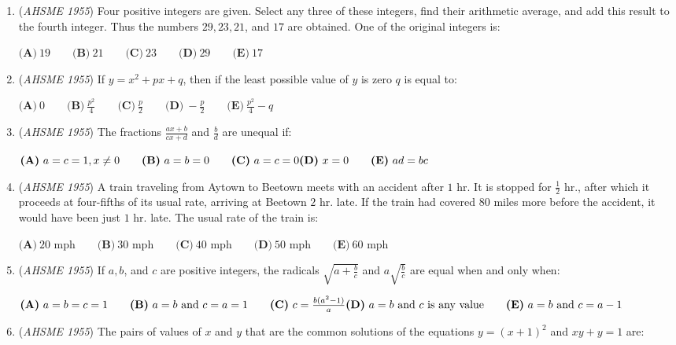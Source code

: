 \begin{enumerate}
	\item (\textit{AHSME 1955}) Four positive integers are given. Select any three of these integers, find their arithmetic average, 
and add this result to the fourth integer. Thus the numbers $29, 23, 21$, and $17$ are obtained. One of the original integers is: 


 $\textbf{(A)}\ 19 \qquad \textbf{(B)}\ 21 \qquad \textbf{(C)}\ 23 \qquad \textbf{(D)}\ 29 \qquad \textbf{(E)}\ 17$


	\item (\textit{AHSME 1955}) If $y=x^2+px+q$, then if the least possible value of $y$ is zero $q$ is equal to: 


 $\textbf{(A)}\ 0\qquad\textbf{(B)}\ \frac{p^2}{4}\qquad\textbf{(C)}\ \frac{p}{2}\qquad\textbf{(D)}\ -\frac{p}{2}\qquad\textbf{(E)}\ \frac{p^2}{4}-q$


	\item (\textit{AHSME 1955}) The fractions $\frac{ax+b}{cx+d}$ and $\frac{b}{d}$ are unequal if: 


 $\textbf{(A)}\ a=c=1, x\neq 0\qquad\textbf{(B)}\ a=b=0\qquad\textbf{(C)}\ a=c=0\\ \textbf{(D)}\ x=0\qquad\textbf{(E)}\ ad=bc$


	\item (\textit{AHSME 1955}) A train traveling from Aytown to Beetown meets with an accident after $1$ hr. It is stopped for $\frac{1}{2}$ hr., 
after which it proceeds at four-fifths of its usual rate, arriving at Beetown $2$ hr. late. 
If the train had covered $80$ miles more before the accident, it would have been just $1$ hr. late. 
The usual rate of the train is: 


 $\textbf{(A)}\ \text{20 mph}\qquad\textbf{(B)}\ \text{30 mph}\qquad\textbf{(C)}\ \text{40 mph}\qquad\textbf{(D)}\ \text{50 mph}\qquad\textbf{(E)}\ \text{60 mph}$


	\item (\textit{AHSME 1955}) If $a, b$, and $c$ are positive integers, the radicals $\sqrt{a+\frac{b}{c}}$ and $a\sqrt{\frac{b}{c}}$ are equal when and only when: 


 $\textbf{(A)}\ a=b=c=1\qquad\textbf{(B)}\ a=b\text{ and }c=a=1\qquad\textbf{(C)}\ c=\frac{b(a^2-1)}{a}\\ \textbf{(D)}\ a=b\text{ and }c\text{ is any value}\qquad\textbf{(E)}\ a=b\text{ and }c=a-1$


	\item (\textit{AHSME 1955}) The pairs of values of $x$ and $y$ that are the common solutions of the equations $y=(x+1)^2$ and $xy+y=1$ are: 



\end{enumerate}
